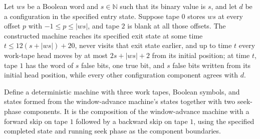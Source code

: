 \begin{theorem}
\label{Turing.rt_windowAdv_run}
\leanok
{}
Let $ws$ be a Boolean word and $s\in\mathbb N$ such that its binary value is $s$, and
let $d$ be a configuration in the specified entry state. Suppose tape $0$ stores $ws$ at
every offset $p$ with $-1\le p\le |ws|$, and tape $2$ is blank at all those offsets. The
constructed machine reaches its specified exit state at some time $t\le12(s+|ws|)+20$,
never visits that exit state earlier, and up to time $t$ every work-tape head moves by
at most $2s+|ws|+2$ from its initial position; at time $t$, tape $1$ has the word of $s$
false bits, one true bit, and $s$ false bits written from its initial head position,
while every other configuration component agrees with $d$.
\end{theorem}

\begin{definition}
\label{Turing.rt_windowTM}
\leanok
{}
Define a deterministic machine with three work tapes, Boolean symbols, and states formed
from the window-advance machine's states together with two seek-phase components. It is
the composition of the window-advance machine with a forward skip on tape $1$ followed
by a backward skip on tape $1$, using the specified completed state and running seek
phase as the component boundaries.
\end{definition}

